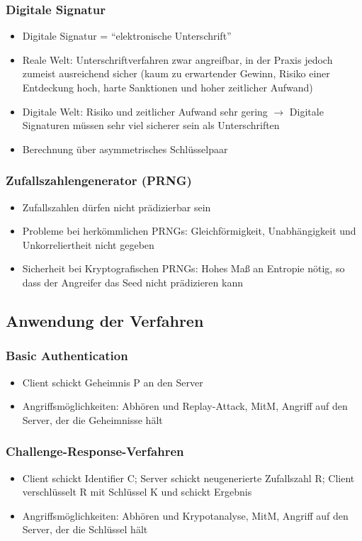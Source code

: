 \subsubsection{Digitale Signatur}
\begin{itemize}
	\item Digitale Signatur = "`elektronische Unterschrift"'
	\item Reale Welt: Unterschriftverfahren zwar angreifbar, in der Praxis jedoch zumeist ausreichend sicher (kaum zu erwartender Gewinn, Risiko einer Entdeckung hoch, harte Sanktionen und hoher zeitlicher Aufwand)
	\item Digitale Welt: Risiko und zeitlicher Aufwand sehr gering $\rightarrow$ Digitale Signaturen müssen sehr viel sicherer sein als Unterschriften
	\item Berechnung über asymmetrisches Schlüsselpaar
\end{itemize}

\subsubsection{Zufallszahlengenerator (PRNG)}
\begin{itemize}
	\item Zufallszahlen dürfen nicht prädizierbar sein
	\item Probleme bei herkömmlichen PRNGs: Gleichförmigkeit, Unabhängigkeit und Unkorreliertheit nicht gegeben
	\item Sicherheit bei Kryptografischen PRNGs: Hohes Maß an Entropie nötig, so dass der Angreifer das Seed nicht prädizieren kann
\end{itemize}

\subsection{Anwendung der Verfahren}

\subsubsection{Basic Authentication}
\begin{itemize}
	\item Client schickt Geheimnis P an den Server
	\item Angriffsmöglichkeiten: Abhören und Replay-Attack, MitM, Angriff auf den Server, der die Geheimnisse hält
\end{itemize}

\subsubsection{Challenge-Response-Verfahren}
\begin{itemize}
	\item Client schickt Identifier C; Server schickt neugenerierte Zufallszahl R; Client verschlüsselt R mit Schlüssel K und schickt Ergebnis
	\item Angriffsmöglichkeiten: Abhören und Krypotanalyse, MitM, Angriff auf den Server, der die Schlüssel hält
\end{itemize}

